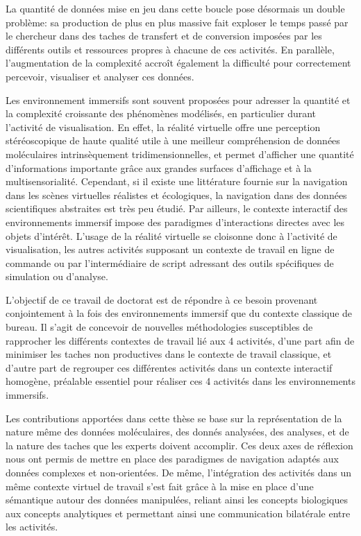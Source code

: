 La quantité de données mise en jeu dans cette boucle pose désormais un double problème: sa production de plus en plus massive fait exploser le temps passé par le chercheur dans des taches de transfert et de conversion imposées par les différents outils et ressources propres à chacune de ces activités. En parallèle, l'augmentation de la complexité accroît également la difficulté pour correctement percevoir, visualiser et analyser ces données.

Les environnement immersifs sont souvent proposées pour adresser la quantité et la complexité croissante des phénomènes modélisés, en particulier durant l'activité de visualisation. En effet, la réalité virtuelle offre une perception stéréoscopique de haute qualité utile à une meilleur compréhension de données moléculaires intrinsèquement tridimensionnelles, et permet d'afficher une quantité d'informations importante grâce aux grandes surfaces d'affichage et à la multisensorialité. Cependant, si il existe une littérature fournie sur la navigation dans les scènes virtuelles réalistes et écologiques, la navigation dans des données scientifiques abstraites est très peu étudié. Par ailleurs, le contexte interactif des environnements immersif impose des paradigmes d'interactions directes avec les objets d'intérêt. L'usage de la réalité virtuelle se cloisonne donc à l'activité de visualisation, les autres activités supposant un contexte de travail en ligne de commande ou par l'intermédiaire de script adressant des outils spécifiques de simulation ou d'analyse.

L'objectif de ce travail de doctorat est de répondre à ce besoin provenant conjointement à la fois des environnements immersif que du contexte classique de bureau. Il s'agit de concevoir de nouvelles méthodologies susceptibles de rapprocher les différents contextes de travail lié aux 4 activités, d'une part afin de minimiser les taches non productives dans le contexte de travail classique, et d'autre part de regrouper ces différentes activités dans un contexte interactif homogène, préalable essentiel pour réaliser ces 4 activités dans les environnements immersifs.

Les contributions apportées dans cette thèse se base sur la représentation de la nature même des données moléculaires, des donnés analysées, des analyses, et de la nature des taches que les experts doivent accomplir. Ces deux axes de réflexion nous ont permis de mettre en place des paradigmes de navigation adaptés aux données complexes et non-orientées. De même, l'intégration des activités dans un même contexte virtuel de travail s'est fait grâce à la mise en place d'une sémantique autour des données manipulées, reliant ainsi les concepts biologiques aux concepts analytiques et permettant ainsi une communication bilatérale entre les activités.


